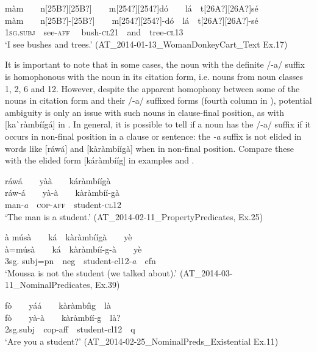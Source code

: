 \documentclass[output=paper]{langsci/langscibook}
\begin{document}
\ea\label{ex:teo:16}
\label{bkm:Ref432710511}m\`{a}m\ \ \ \ n[25B?][25B?]\ \ \ \ m[254?][254?]dó\ \ \ \ lá\ \ t[26A?][26A?]sé\\
\gll m\`{a}m\ \ \ \ n[25B?]-[25B?]\ \ \ \ m[254?][254?]-dó\ \ lá\ \ t[26A?][26A?]-sé\\
1\textsc{sg.subj}\ \ see-\textsc{aff} \ \ bush\nobreakdash-\textsc{cl21\ \ }and\ \ tree-\textsc{cl13}\\
\glt ‘I see bushes and trees.’ (AT\_2014-01-13\_WomanDonkeyCart\_Text Ex.17)
\z

It is important to note that in some cases, the noun with the definite /\nobreakdash-a/\textit{ }suffix is homophonous with the noun in its citation form, i.e. nouns from noun classes 1, 2, 6 and 12. However, despite the apparent homophony between some of the nouns in citation form and their /\nobreakdash-a/ suffixed forms (fourth column in ), potential ambiguity is only an issue with such nouns in clause-final position, as with [ka\`{ }ràmbíígá] in . In general, it is possible to tell if a noun has the /\nobreakdash-a/ suffix if it occurs in non-final position in a clause or sentence: the \textit{\nobreakdash-a} suffix is not elided in words like [ráwá]  and [k\`{a}ràmbíígà]  when in non-final position. Compare these with the elided form [káràmbííg] in examples  and .

\ea\label{ex:teo:17}
\label{bkm:Ref264213739}ráwá\ \ \ \ y\`{a}\`{a}\ \ \ \ k\'{a}ràmbííg\`{a}\\
\gll ráw\nobreakdash-á\ \ \ \ y\`{a}-\`{a}\ \ \ \ k\`{a}ràmbíí\nobreakdash-g\`{a}\\
man\nobreakdash-\textit{a}\textsc{\ \ cop-aff}\ \ student\nobreakdash-\textsc{cl12}\\
\glt ‘The man is a student.’ (AT\_2014-02-11\_PropertyPredicates, Ex.25)
\z

\ea\label{ex:teo:18}
\label{bkm:Ref264213779}à músà\ \ \ \ ká\ \ k\`{a}ràmbíígà\ \ \ \ yè\\
\gll à=músà\ \ \ \ ká\ \ k\`{a}ràmbíí\nobreakdash-g\nobreakdash-à\ \ \ \ yè \\
3sg. subj=pn\ \ neg\ \ student\nobreakdash-cl12\nobreakdash-\textit{a}\ \ cfn\\
\glt ‘Moussa is not the student (we talked about).’ (AT\_2014-03-11\_NominalPredicates, Ex.39)
\z

\ea\label{ex:teo:19}
\label{bkm:Ref264216107}fò\ \ \ \ y\'{a}\'{a}\ \ \ \ kàràmbíìg\ \ là\\
\gll fò\ \ \ \ y\`{a}-\`{a}\ \ \ \ kàràmbí\'{i}\nobreakdash-g\ \ là?\\
2sg.subj\ \ cop-aff\ \ student\nobreakdash-cl12\ \ q\\
\glt ‘Are you a student?’ (AT\_2014-02-25\_NominalPreds\_Existential Ex.11)
\z
\end{document}
